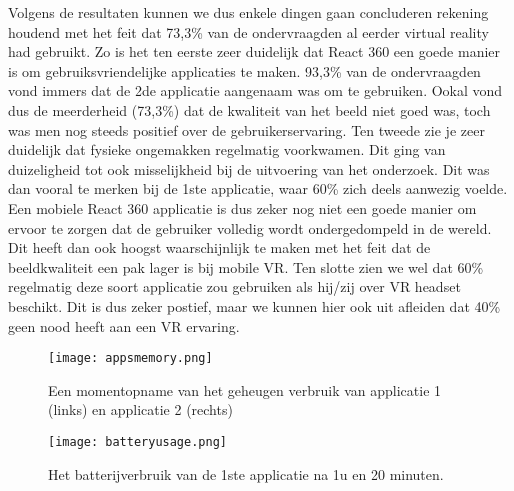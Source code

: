 Volgens de resultaten kunnen we dus enkele dingen gaan concluderen rekening houdend met het feit dat 73,3\% van de ondervraagden al eerder virtual reality had gebruikt. Zo is het ten eerste zeer duidelijk dat React 360 een goede manier is om gebruiksvriendelijke applicaties te maken. 93,3\% van de ondervraagden vond immers dat de 2de applicatie aangenaam was om te gebruiken. Ookal vond dus de meerderheid (73,3\%) dat de kwaliteit van het beeld niet goed was, toch was men nog steeds positief over de gebruikerservaring. Ten tweede zie je zeer duidelijk dat fysieke ongemakken regelmatig voorkwamen. Dit ging van duizeligheid tot ook misselijkheid bij de uitvoering van het onderzoek. Dit was dan vooral te merken bij de 1ste applicatie, waar  60\% zich deels aanwezig voelde. Een mobiele React 360 applicatie is dus zeker nog niet een goede manier om ervoor te zorgen dat de gebruiker volledig wordt ondergedompeld in de wereld. Dit heeft dan ook hoogst waarschijnlijk te maken met het feit dat de beeldkwaliteit een pak lager is bij mobile VR. Ten slotte zien we wel dat 60\% regelmatig deze soort applicatie zou gebruiken als hij/zij over VR headset beschikt. Dit is dus zeker postief, maar we kunnen hier ook uit afleiden dat 40\% geen nood heeft aan een VR ervaring.

\begin{figure}
	\centering
	\texttt{[image: appsmemory.png]}
	\caption{Een momentopname van het geheugen verbruik van applicatie 1 (links) en applicatie 2 (rechts)}
	\label{fig:appsmemory}
\end{figure}

\begin{figure}
	\centering
	\texttt{[image: batteryusage.png]}
	\caption{Het batterijverbruik van de 1ste applicatie na 1u en 20 minuten.}
	\label{fig:batteryusage}
\end{figure}
